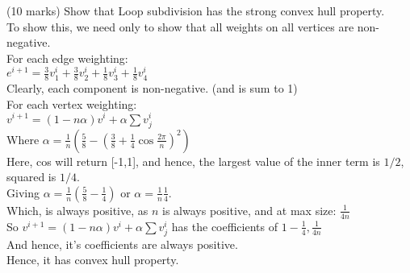 (10 marks) Show that Loop subdivision has the strong convex hull property. \\

To show this, we need only to show that all weights on all vertices are non-negative. \\
For each edge weighting:\\ 
$e^{i+1} = \frac{3}{8}v_1^i + \frac{3}{8} v_2^i + \frac{1}{8} v_3^i + \frac{1}{8} v_4^i$ \\
Clearly, each component is non-negative. (and is sum to 1)\\
For each vertex weighting: \\
$v^{i+1} = (1 - n \alpha )v^i + \alpha \sum v^i_j $ \\
Where $\alpha = \frac{1}{n} ( \frac{5}{8} - ( \frac{3}{8} + \frac{1}{4} \cos \frac{2 \pi }{n})^2 )$ \\
Here, cos will return [-1,1], and hence, the largest value of the inner term is $1/2$, squared is $1/4$. \\
Giving $\alpha = \frac{1}{n} ( \frac{5}{8} - \frac{1}{4} )$ or $\alpha = \frac{1}{n} \frac{1}{4}$. \\
Which, is always positive, as $n$ is always positive, and at max size: $\frac{1}{4 n}$ \\
So $v^{i+1} = (1 - n \alpha)v^i + \alpha \sum v^i_j$  has the coefficients of $1-\frac{1}{4} , \frac{1}{4n}$  \\
And hence, it's coefficients are always positive. \\
Hence, it has convex hull property.
